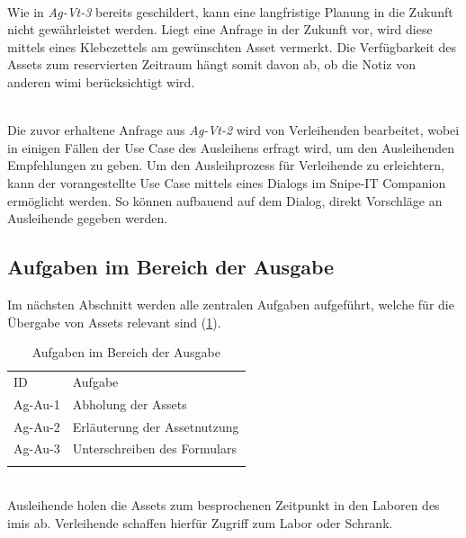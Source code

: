         {\sffamily\color{maincolor}{Ag-Vt-4 | Reservierung der Assets}}\\
Wie in \textit{Ag-Vt-3} bereits geschildert, kann eine langfristige Planung
in die Zukunft nicht gewährleistet werden. Liegt eine Anfrage in der Zukunft vor, wird diese mittels
eines Klebezettels am gewünschten Asset vermerkt. Die Verfügbarkeit des Assets zum reservierten
Zeitraum hängt somit davon ab, ob die Notiz von anderen \ac{wimi} berücksichtigt wird.

        {\sffamily\color{maincolor}{Ag-Vt-5 | Beratung der Ausleihenden}}\\
Die zuvor erhaltene Anfrage aus \textit{Ag-Vt-2} wird von Verleihenden
bearbeitet, wobei in einigen Fällen der Use Case des Ausleihens erfragt wird, um den Ausleihenden
Empfehlungen zu geben. Um den Ausleihprozess für
Verleihende zu erleichtern, kann der vorangestellte Use Case mittels eines Dialogs im Snipe-IT
Companion ermöglicht werden. So können aufbauend auf dem Dialog, direkt Vorschläge an Ausleihende
gegeben werden.


\subsection{Aufgaben im Bereich der Ausgabe}
Im nächsten Abschnitt werden alle zentralen Aufgaben aufgeführt, welche für die Übergabe von Assets
relevant sind (\ref{table:Ag-Au}).

\begin{table}[h]
        \centering
        \caption{Aufgaben im Bereich der Ausgabe}
        \begin{tabular}{ll}
                \arrayrulecolor{maincolor}\hline
                \sffamily\color{maincolor}ID & \sffamily\color{maincolor}Aufgabe \\
                \arrayrulecolor{maincolor}\hline
                Ag-Au-1                      & Abholung der Assets               \\
                Ag-Au-2                      & Erläuterung der Assetnutzung      \\
                Ag-Au-3                      & Unterschreiben des Formulars      \\
                \arrayrulecolor{maincolor}\hline
        \end{tabular}
        \label{table:Ag-Au}
\end{table}

{\sffamily\color{maincolor}{Ag-Au-1 | Abholung der Assets}}\\
Ausleihende holen die Assets zum besprochenen Zeitpunkt in den Laboren des \ac{imis} ab. Verleihende
schaffen hierfür Zugriff zum Labor oder Schrank.

